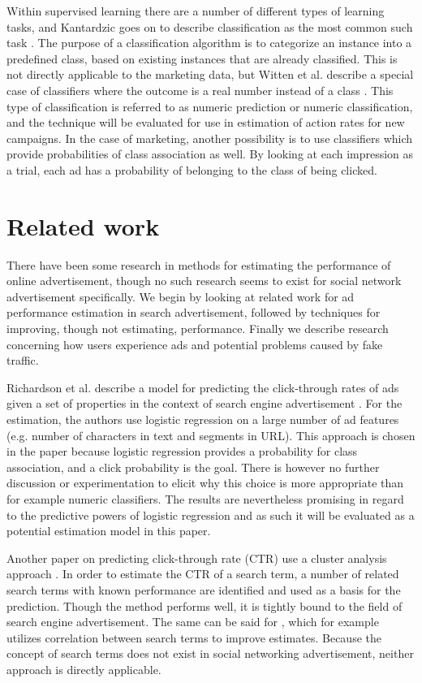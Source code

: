 \documentclass{sig-alternate}
\begin{document}
Within supervised learning there are a number of different types of learning tasks, and Kantardzic goes on to describe classification as the most common such task \cite{Kantardzic2011}. The purpose of a classification algorithm is to categorize an instance into a predefined class, based on existing instances that are already classified. This is not directly applicable to the marketing data, but Witten et al. describe a special case of classifiers where the outcome is a real number instead of a class \citep{Witten2011}. This type of classification is referred to as numeric prediction or numeric classification, and the technique will be evaluated for use in estimation of action rates for new campaigns. In the case of marketing, another possibility is to use classifiers which provide probabilities of class association as well. By looking at each impression as a trial, each ad has a probability of belonging to the class of being clicked.

\section{Related work}
\label{ch:RelatedWorks}
There have been some research in methods for estimating the performance of online advertisement, though no such research seems to exist for social network advertisement specifically. We begin by looking at related work for ad performance estimation in search advertisement, followed by techniques for improving, though not estimating, performance. Finally we describe research concerning how users experience ads and potential problems caused by fake traffic.

Richardson et al. describe a model for predicting the click-through rates of ads given a set of properties in the context of search engine advertisement \cite{Richardson2007}. For the estimation, the authors use logistic regression on a large number of ad features (e.g. number of characters in text and segments in URL). This approach is chosen in the paper because logistic regression provides a probability for class association, and a click probability is the goal. There is however no further discussion or experimentation to elicit why this choice is more appropriate than for example numeric classifiers. The results are nevertheless promising in regard to the predictive powers of logistic regression and as such it will be evaluated as a potential estimation model in this paper.

Another paper on predicting click-through rate (CTR) use a cluster analysis approach \cite{Regelson2006}. In order to estimate the CTR of a search term, a number of related search terms with known performance are identified and used as a basis for the prediction. Though the method performs well, it is tightly bound to the field of search engine advertisement. The same can be said for \cite{Richardson2007}, which for example utilizes correlation between search terms to improve estimates. Because the concept of search terms does not exist in social networking advertisement, neither approach is directly applicable.
\end{document}
